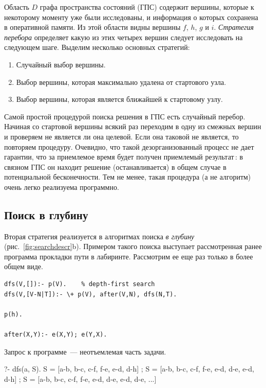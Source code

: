 \documentclass[a4paper,14pt, openany, twoside, draft]{extbook} %
\begin{document}
Область $D$ графа пространства состояний (ГПС) содержит вершины, которые к некоторому моменту уже были исследованы, и информация о которых сохранена в оперативной памяти.  Из этой области видны вершины $f$, $h$, $g$ и $i$.  \emph{Стратегия перебора} определяет какую из этих четырех вершин следует исследовать на следующем шаге.  Выделим несколько основных стратегий:
\begin{enumerate}
\item Случайный выбор вершины.
\item Выбор вершины, которая максимально удалена от стартового узла.
\item Выбор вершины, которая является ближайшей к стартовому узлу.
\end{enumerate}

Самой простой процедурой поиска решения в ГПС есть случайный перебор.  Начиная со стартовой вершины всякий раз переходим в одну из смежных вершин и проверяем не является ли она целевой.  Если она таковой не является, то повторяем процедуру.  Очевидно, что такой дезорганизованный процесс не дает гарантии, что за приемлемое время будет получен приемлемый результат\,: в связном ГПС он находит решение (останавливается) в общем случае в потенциальной бесконечности.  Тем не менее, такая процедура (а не алгоритм) очень легко реализуема программно.

\subsection{Поиск в глубину}
\label{sec:depthfirst}

Вторая стратегия реализуется в алгоритмах поиска \emph{в глубину} (рис.~\ref{fig:searchdescr}b).  Примером такого поиска выступает рассмотренная ранее программа прокладки пути в лабиринте.  Рассмотрим ее еще раз только в более общем виде.

\begin{verbatim}
dfs(V,[]):- p(V).    % depth-first search
dfs(V,[V-N|T]):- \+ p(V), after(V,N), dfs(N,T).

p(h).

after(X,Y):- e(X,Y); e(Y,X).
\end{verbatim}

\noindent{}Запрос к программе~--- неотъемлемая часть задачи.

\begin{proexp}
?- dfs(a, S).
S = [a-b, b-c, c-f, f-e, e-d, d-h] ;
S = [a-b, b-c, c-f, f-e, e-d, d-e, e-d, d-h] ;
S = [a-b, b-c, c-f, f-e, e-d, d-e, e-d, d-e, ...]
\end{proexp}
\end{document}
